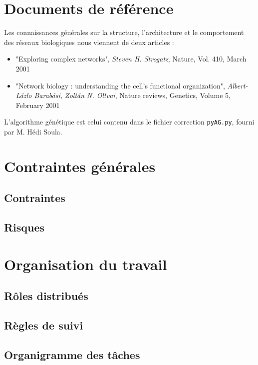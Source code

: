 \section{Documents de référence}
Les connaissances générales sur la structure, l'architecture et le comportement des réseaux biologiques nous viennent de deux articles :

\begin{itemize}
	\item "Exploring complex networks", \textit{Steven H. Strogatz}, Nature, Vol. 410, March 2001
	\item "Network biology : understanding the cell's functional organization", \textit{Albert-L\'{a}zlo Barab\'{a}si, Zolt\'{a}n N. Oltvai}, Nature reviews, Genetics, Volume 5, February 2001\medskip
\end{itemize}


L'algorithme génétique est celui contenu dans le fichier correction \texttt{pyAG.py}, fourni par M. Hédi Soula.

\section{Contraintes générales}

\subsection{Contraintes}

\subsection{Risques}

\section{Organisation du travail}
\subsection{Rôles distribués}

\subsection{Règles de suivi}

\subsection{Organigramme des tâches}

